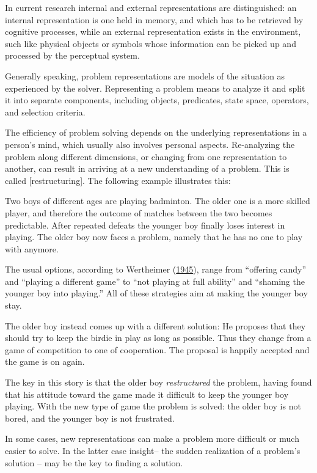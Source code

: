 \documentclass[
]{krantz}
\begin{document}
In current research internal and external representations are distinguished: an internal representation is one held in memory, and which has to be retrieved by cognitive processes, while an external representation exists in the environment, such like physical objects or symbols whose information can be picked up and processed by the perceptual system.

Generally speaking, problem representations are models of the situation as experienced by the solver. Representing a problem means to analyze it and split it into separate components, including objects, predicates, state space, operators, and selection criteria.

The efficiency of problem solving depends on the underlying representations in a person's mind, which usually also involves personal aspects. Re-analyzing the problem along different dimensions, or changing from one representation to another, can result in arriving at a new understanding of a problem. This is called {[}restructuring{]}. The following example illustrates this:

Two boys of different ages are playing badminton. The older one is a more skilled player, and therefore the outcome of matches between the two becomes predictable. After repeated defeats the younger boy finally loses interest in playing. The older boy now faces a problem, namely that he has no one to play with anymore.

The usual options, according to Wertheimer (\protect\hyperlink{ref-wertheimer1945productive}{1945}), range from ``offering candy'' and ``playing a different game'' to ``not playing at full ability'' and ``shaming the younger boy into playing.'' All of these strategies aim at making the younger boy stay.

The older boy instead comes up with a different solution: He proposes that they should try to keep the birdie in play as long as possible. Thus they change from a game of competition to one of cooperation. The proposal is happily accepted and the game is on again.

The key in this story is that the older boy \emph{restructured} the problem, having found that his attitude toward the game made it difficult to keep the younger boy playing. With the new type of game the problem is solved: the older boy is not bored, and the younger boy is not frustrated.

In some cases, new representations can make a problem more difficult or much easier to solve. In the latter case insight-- the sudden realization of a problem's solution -- may be the key to finding a solution.
\end{document}
